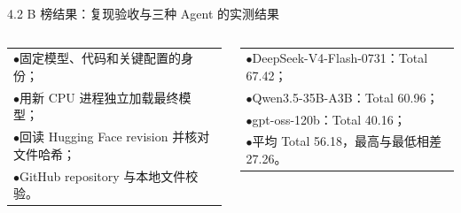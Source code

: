 \begin{frame}{4.2 B 榜结果：复现验收与三种 Agent 的实测结果}
    \centering

    \begin{columns}[T,onlytextwidth]
        \footnotesize
        \begin{tabular}{@{}>{\raggedright\arraybackslash}p{0.98\linewidth}@{}}
            \textcolor{accentRed}{\tiny$\bullet$}\hspace{0.4em}固定模型、代码和关键配置的身份；\\[1.2mm]
            \textcolor{accentRed}{\tiny$\bullet$}\hspace{0.4em}用新 CPU 进程独立加载最终模型；\\[1.2mm]
            \textcolor{accentRed}{\tiny$\bullet$}\hspace{0.4em}回读 Hugging Face revision 并核对文件哈希；\\[1.2mm]
            \textcolor{accentRed}{\tiny$\bullet$}\hspace{0.4em}GitHub repository 与本地文件校验。
        \end{tabular}
        \footnotesize
        \begin{tabular}{@{}>{\raggedright\arraybackslash}p{0.98\linewidth}@{}}
            \textcolor{accentRed}{\tiny$\bullet$}\hspace{0.4em}DeepSeek-V4-Flash-0731：Total 67.42；\\[1.2mm]
            \textcolor{accentRed}{\tiny$\bullet$}\hspace{0.4em}Qwen3.5-35B-A3B：Total 60.96；\\[1.2mm]
            \textcolor{accentRed}{\tiny$\bullet$}\hspace{0.4em}gpt-oss-120b：Total 40.16；\\[1.2mm]
            \textcolor{accentRed}{\tiny$\bullet$}\hspace{0.4em}平均 Total 56.18，最高与最低相差 27.26。
        \end{tabular}
        \vspace{1.5mm}
    \end{columns}
\end{frame}
